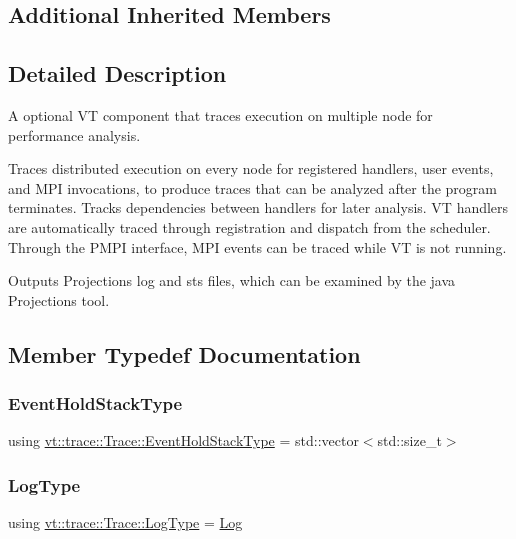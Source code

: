 \subsection*{Additional Inherited Members}


\subsection{Detailed Description}
A optional VT component that traces execution on multiple node for performance analysis. 

Traces distributed execution on every node for registered handlers, user events, and M\+PI invocations, to produce traces that can be analyzed after the program terminates. Tracks dependencies between handlers for later analysis. VT handlers are automatically traced through registration and dispatch from the scheduler. Through the P\+M\+PI interface, M\+PI events can be traced while VT is not running.

Outputs Projections log and sts files, which can be examined by the java Projections tool. 

\subsection{Member Typedef Documentation}
\mbox{\label{structvt_1_1trace_1_1_trace_a727542f4171681f2ef03df2c3abce04c}} 
\subsubsection{\texorpdfstring{Event\+Hold\+Stack\+Type}{EventHoldStackType}}
{\footnotesize\ttfamily using \hyperlink{structvt_1_1trace_1_1_trace_a727542f4171681f2ef03df2c3abce04c}{vt\+::trace\+::\+Trace\+::\+Event\+Hold\+Stack\+Type} =  std\+::vector$<$std\+::size\+\_\+t$>$}

\mbox{\label{structvt_1_1trace_1_1_trace_a43306d96a91e49db081eaea016f1dd0a}} 
\subsubsection{\texorpdfstring{Log\+Type}{LogType}}
{\footnotesize\ttfamily using \hyperlink{structvt_1_1trace_1_1_trace_a43306d96a91e49db081eaea016f1dd0a}{vt\+::trace\+::\+Trace\+::\+Log\+Type} =  \hyperlink{structvt_1_1trace_1_1_log}{Log}}

